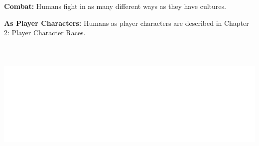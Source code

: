 \begin{multicols}{2}
\textbf{Combat:} Humans fight in as many different ways as they have cultures.

\textbf{As Player Characters:} Humans as player characters are described in Chapter 2: Player Character Races.

\noindent\includegraphics[width=\columnwidth, height=2.5in]{testblock.pdf}

\end{multicols}

